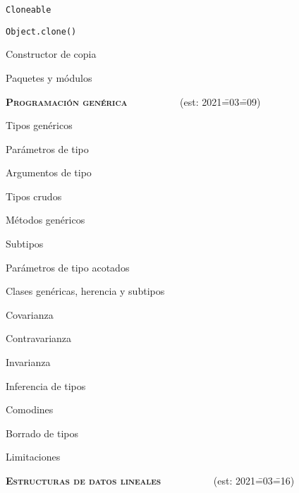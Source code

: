 \begin{longenum}
\begin{longenum}
\begin{longenum}
            \begin{longenum}
                \item \texttt{Cloneable}
                \item \texttt{Object.clone()}
                \item Constructor de copia
            \end{longenum}
        \end{longenum}
        \item Paquetes y módulos
    \end{longenum}
    \item \textbf{\textsc{Programación genérica}} \ \ \ \ \ \ \ \ \ \ (est: 2021\==03\==09)
    \begin{longenum}
        \item Tipos genéricos
        \begin{longenum}
            \item Parámetros de tipo
            \item Argumentos de tipo
            \item Tipos crudos
        \end{longenum}
        \item Métodos genéricos
        \item Subtipos
        \begin{longenum}
            \item Parámetros de tipo acotados
            \item Clases genéricas, herencia y subtipos
            \begin{longenum}
                \item Covarianza
                \item Contravarianza
                \item Invarianza
            \end{longenum}
        \end{longenum}
        \item Inferencia de tipos
        \item Comodines
        \item Borrado de tipos
        \item Limitaciones
    \end{longenum}
    \item \textbf{\textsc{Estructuras de datos lineales}} \ \ \ \ \ \ \ \ \ \ (est: 2021\==03\==16)
    \begin{longenum}

\end{longenum}
\end{longenum}
